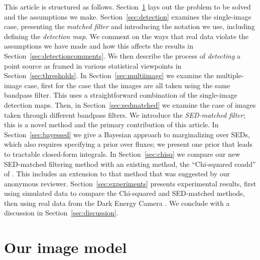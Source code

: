 \documentclass[11pt,letterpaper,linenumbers]{aastex7}
\newcommand{\Secref}[1]{\mbox{Section~\ref{#1}}}
\newcommand{\secref}[1]{\mbox{Section~\ref{#1}}}
\newcommand{\subsecref}[1]{\mbox{Section~\ref{#1}}}
\newcommand{\changed}[1]{#1}
\begin{document}
\changed{
This article is structured as follows.
\Secref{sec:imagemodel} lays out the problem to be solved and the assumptions
we make.
\Secref{sec:detection} examines the single-image case, presenting the \emph{matched filter}
and introducing the notation we use, including defining the \emph{detection map}.
We comment on the ways that real data violate the assumptions we have made and how
this affects the results in \subsecref{sec:detectioncomments}.
We then describe the process of \emph{detecting} a point source as framed in various
statistical viewpoints in \subsecref{sec:thresholds}.
In \secref{sec:multiimage} we examine the multiple-image case, first for the case that
the images are all taken using the same bandpass filter.  This uses a straightforward
combination of the single-image detection maps.
Then, in \subsecref{sec:sedmatched} we examine the case of images taken through
different bandpass filters.  We introduce the \emph{SED-matched filter}; this is a novel
method and the primary contribution of this article.
In \subsecref{sec:bayessed} we give a Bayesian approach to marginalizing over SEDs,
which also requires specifying a prior over fluxes; we present one prior that leads to
tractable closed-form integrals.
In \secref{sec:chisq} we compare our new SED-matched filtering method with an existing
method, the ``Chi-squared coadd'' of \cite{szalay1999}.  This includes an extension to that
method that was suggested by our anonymous reviewer.
\Secref{sec:experiments} presents experimental results, first using simulated data to
compare the Chi-squared and SED-matched methods, then using real data from the
Dark Energy Camera \citep{decam}.
We conclude with a discussion in \secref{sec:discussion}.
}

\section{Our image model}
\label{sec:imagemodel}
\end{document}
